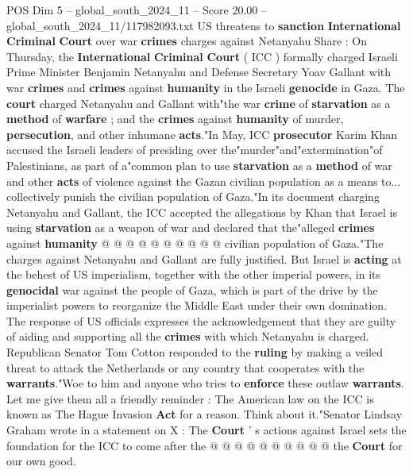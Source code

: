 \begin{textsample}{POS Dim 5 – global\_south\_2024\_11 – Score 20.00 – global\_south\_2024\_11/117982093.txt}  \label{ex:f5_pos_027}
US threatens to \textbf{sanction} \textbf{International} \textbf{Criminal} \textbf{Court} over war \textbf{crimes} charges against Netanyahu Share : On Thursday, the \textbf{International} \textbf{Criminal} \textbf{Court} ( ICC ) formally charged Israeli Prime Minister Benjamin Netanyahu and Defense Secretary Yoav Gallant with war \textbf{crimes} and \textbf{crimes} against \textbf{humanity} in the Israeli \textbf{genocide} in Gaza.
The \textbf{court} charged Netanyahu and Gallant with"the war \textbf{crime} of \textbf{starvation} as a \textbf{method} of \textbf{warfare} ; and the \textbf{crimes} against \textbf{humanity} of murder, \textbf{persecution}, and other inhumane \textbf{acts}."In May, ICC \textbf{prosecutor} Karim Khan accused the Israeli leaders of presiding over the"murder"and"extermination"of Palestinians, as part of a"common plan to use \textbf{starvation} as a \textbf{method} of war and other \textbf{acts} of violence against the Gazan civilian population as a means to... collectively punish the civilian population of Gaza."In its document charging Netanyahu and Gallant, the ICC accepted the allegations by Khan that Israel is using \textbf{starvation} as a weapon of war and declared that the"alleged \textbf{crimes} against \textbf{humanity} @ @ @ @ @ @ @ @ @ @ civilian population of Gaza."The charges against Netanyahu and Gallant are fully justified.
But Israel is \textbf{acting} at the behest of US imperialism, together with the other imperial powers, in its \textbf{genocidal} war against the people of Gaza, which is part of the drive by the imperialist powers to reorganize the Middle East under their own domination.
The response of US officials expresses the acknowledgement that they are guilty of aiding and supporting all the \textbf{crimes} with which Netanyahu is charged.
Republican Senator Tom Cotton responded to the \textbf{ruling} by making a veiled threat to attack the Netherlands or any country that cooperates with the \textbf{warrants}."Woe to him and anyone who tries to \textbf{enforce} these outlaw \textbf{warrants}.
Let me give them all a friendly reminder : The American law on the ICC is known as The Hague Invasion \textbf{Act} for a reason.
Think about it."Senator Lindsay Graham wrote in a statement on X : The \textbf{Court} ' s actions against Israel sets the foundation for the ICC to come after the @ @ @ @ @ @ @ @ @ @ the \textbf{Court} for our own good.

\end{textsample}
